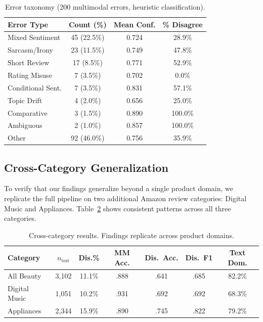 \documentclass[11pt,a4paper]{article}
\begin{document}
\begin{table}[htbp]
\centering
\caption{Error taxonomy (200 multimodal errors, heuristic classification).}
\label{tab:errors}
\begin{tabular}{lccc}
\toprule
\textbf{Error Type} & \textbf{Count (\%)} & \textbf{Mean Conf.} & \textbf{\% Disagree} \\
\midrule
Mixed Sentiment      & 45 (22.5\%) & 0.724 & 28.9\% \\
Sarcasm/Irony        & 23 (11.5\%) & 0.749 & 47.8\% \\
Short Review         & 17 (8.5\%)  & 0.771 & 52.9\% \\
Rating Misuse        & 7 (3.5\%)   & 0.702 & 0.0\% \\
Conditional Sent.    & 7 (3.5\%)   & 0.831 & 57.1\% \\
Topic Drift          & 4 (2.0\%)   & 0.656 & 25.0\% \\
Comparative          & 3 (1.5\%)   & 0.890 & 100.0\% \\
Ambiguous            & 2 (1.0\%)   & 0.857 & 100.0\% \\
Other                & 92 (46.0\%) & 0.756 & 35.9\% \\
\bottomrule
\end{tabular}
\end{table}

\subsection{Cross-Category Generalization}

To verify that our findings generalize beyond a single product domain, we replicate the full pipeline on two additional Amazon review categories: Digital Music and Appliances.
Table~\ref{tab:cross_cat} shows consistent patterns across all three categories.

\begin{table}[htbp]
\centering
\small
\caption{Cross-category results. Findings replicate across product domains.}
\label{tab:cross_cat}
\begin{tabular}{lcccccc}
\toprule
\textbf{Category} & $n_{\text{test}}$ & \textbf{Dis.\%} & \textbf{MM Acc.} & \textbf{Dis.\ Acc.} & \textbf{Dis.\ F1} & \textbf{Text Dom.} \\
\midrule
All Beauty     & 3{,}102 & 11.1\% & .888 & .641 & .685 & 82.2\% \\
Digital Music  & 1{,}051 & 10.2\% & .931 & .692 & .692 & 68.3\% \\
Appliances     & 2{,}344 & 15.9\% & .890 & .745 & .822 & 79.2\% \\
\bottomrule
\end{tabular}
\end{table}
\end{document}
